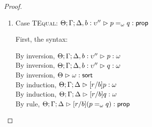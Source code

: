 \begin{proof}
\begin{enumerate}
  For semantics, consider
  $\interp{\judgeA[\Theta; \Gamma; \Delta]
                  {[r/b](Q \beta:\kappa'.\;p)}{\assert}}\;\theta\;\gamma\;\delta$ 
  \begin{eqnproof}
          {Semantics}
          {Induction}
          {Semantics}
  \end{eqnproof}
  In this case we silently use the fact that $\beta$ does not occur free in $e''$ or $B$.

\item Case \textsc{TEqual}: $\judgeA[\Theta; \Gamma; \Delta, b:\upsilon'']{p =_\omega q}{\assert}$
  
  First, the syntax:
  \begin{tabbedproof}
    \oo By inversion, $\judgeA[\Theta; \Gamma; \Delta, b:\upsilon'']{p}{\omega}$ \\
    \oo By inversion, $\judgeA[\Theta; \Gamma; \Delta, b:\upsilon'']{q}{\omega}$ \\
    \oo By inversion, $\judgeSort[\Theta]{\omega}$ \\
    \oo By induction, $\judgeA[\Theta; \Gamma; \Delta]{[r/b]p}{\omega}$ \\
    \oo By induction, $\judgeA[\Theta; \Gamma; \Delta]{[r/b]q}{\omega}$ \\
    \oo By rule, $\judgeA[\Theta; \Gamma; \Delta]{[r/b](p =_\omega q)}{\assert}$
  \end{tabbedproof}


\end{enumerate}
\end{proof}
